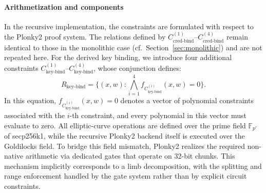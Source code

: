 \paragraph{Arithmetization and components} 
In the recursive implementation, the constraints are formulated with respect to the Plonky2 proof system. 
The relations defined by $C_{\text{cred-bind}}^{(1)}$--$C_{\text{cred-bind}}^{(4)}$ remain identical to those in the monolithic case (cf.~Section~\ref{sec:monolithic}) and are not repeated here. For the derived key binding, we introduce four additional constraints $C_{\text{key-bind}}^{(1)}$--$C_{\text{key-bind}}^{(4)}$, whose conjunction defines:
\[
R_{\text{key-bind}} = \{(x,w) : \bigwedge_{i=1}^4 f_{C_{\text{key-bind}}^{(i)}}(x,w)=0\}.
\]
In this equation, $f_{C_{\text{key-bind}}^{(i)}}(x,w)=0$ denotes a vector of polynomial constraints associated with the $i$-th constraint, and every polynomial in this vector must evaluate to zero. All elliptic-curve operations are defined over the prime field $\mathbb{F}_{p'}$ of secp256k1, while the recursive Plonky2 backend itself is executed over the Goldilocks field. To bridge this field mismatch, Plonky2 realizes the required non-native arithmetic via dedicated gates that operate on 32-bit chunks. This mechanism implicitly corresponds to a limb decomposition, with the splitting and range enforcement handled by the gate system rather than by explicit circuit constraints.

